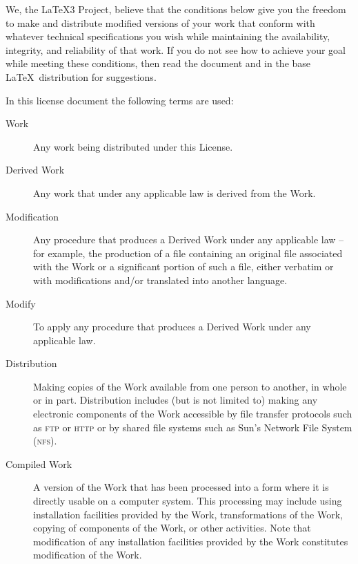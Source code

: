 \begin{LPPLicense}
  We, the \LaTeX3 Project, believe that the conditions below give you
  the freedom to make and distribute modified versions of your work
  that conform with whatever technical specifications you wish while
  maintaining the availability, integrity, and reliability of that
  work.  If you do not see how to achieve your goal while meeting
  these conditions, then read the document  and
   in the base \LaTeX\ distribution for suggestions.


  \label{LPPL:Definitions}

  In this license document the following terms are used:

  \begin{description}
  \item[Work] Any work being distributed under this License.

  \item[Derived Work] Any work that under any applicable law is
    derived from the Work.

  \item[Modification] Any procedure that produces a Derived Work under
    any applicable law -- for example, the production of a file
    containing an original file associated with the Work or a
    significant portion of such a file, either verbatim or with
    modifications and/or translated into another language.

  \item[Modify] To apply any procedure that produces a Derived Work
    under any applicable law.
    
  \item[Distribution] Making copies of the Work available from one
    person to another, in whole or in part.  Distribution includes
    (but is not limited to) making any electronic components of the
    Work accessible by file transfer protocols such as \textsc{ftp} or
    \textsc{http} or by shared file systems such as Sun's Network File
    System (\textsc{nfs}).

  \item[Compiled Work] A version of the Work that has been processed
    into a form where it is directly usable on a computer system.
    This processing may include using installation facilities provided
    by the Work, transformations of the Work, copying of components of
    the Work, or other activities.  Note that modification of any
    installation facilities provided by the Work constitutes
    modification of the Work.


\end{description}
\end{LPPLicense}

